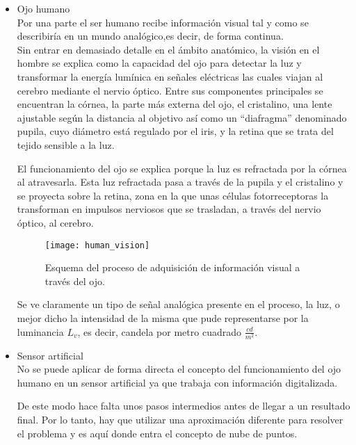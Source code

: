 \begin{itemize}
\item Ojo humano
\\
Por una parte el ser humano recibe información visual tal y como se describiría en un mundo analógico,es decir, de forma continua.
\\
Sin entrar en demasiado detalle en el ámbito anatómico, la visión en el hombre se explica como la capacidad del ojo para detectar la luz y transformar la energía lumínica en señales eléctricas las cuales viajan al cerebro mediante el nervio óptico. Entre sus componentes principales se encuentran la córnea, la parte más externa del ojo, el cristalino, una lente ajustable según la distancia al objetivo así como un ``diafragma'' denominado pupila, cuyo diámetro está regulado por el iris, y la retina que se trata del tejido sensible a la luz. 

El funcionamiento del ojo se explica\cite{ojo_humano} porque la luz es refractada por la córnea al atravesarla. Esta luz refractada pasa a través de la pupila y el cristalino y se proyecta sobre la retina, zona en la que unas células fotorreceptoras la transforman en impulsos nerviosos que se trasladan, a través del nervio óptico, al cerebro.


\begin{figure}[!htb]
\centering
{}
  \texttt{[image: human\_vision]}
  \caption{Esquema del proceso de adquisición de información visual a través del ojo.}\label{fig:human_vision}
\endminipage\hfill
\end{figure}

Se ve claramente un tipo de señal analógica presente en el proceso, la luz, o mejor dicho la intensidad de la misma que pude representarse por la luminancia $L_v$, es decir, candela por metro cuadrado $\frac{cd}{m^2}$.


\item Sensor artificial
\\
No se puede aplicar de forma directa el concepto del funcionamiento del ojo humano en un sensor artificial ya que trabaja con información digitalizada. 

De este modo hace falta unos pasos intermedios antes de llegar a un resultado final. Por lo tanto, hay que utilizar una aproximación diferente para resolver el problema y es aquí donde entra el concepto de nube de puntos. 
\end{itemize}


